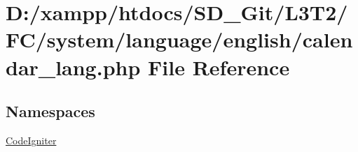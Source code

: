 \hypertarget{calendar__lang_8php}{}\section{D\+:/xampp/htdocs/\+S\+D\+\_\+\+Git/\+L3\+T2/\+F\+C/system/language/english/calendar\+\_\+lang.php File Reference}
\label{calendar__lang_8php}
\subsection*{Namespaces}
\begin{DoxyCompactItemize}
\item 
 \hyperlink{namespace_code_igniter}{Code\+Igniter}
\end{DoxyCompactItemize}
